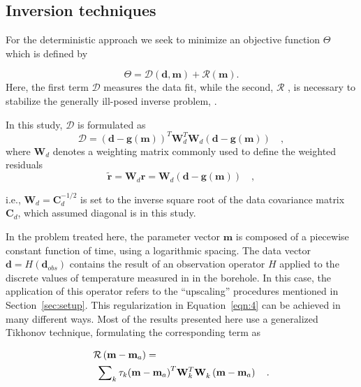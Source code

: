 \documentclass[cp]{copernicus}
\begin{document}
\subsection{Inversion techniques}
\label{sec:tinv}
For the deterministic approach we seek to minimize an objective function 
$\Theta$ which is defined by

\begin{equation}\label{eqn:4}
\Theta  = \mathcal{D}\left(\mathbf{d},\mathbf{m}\right) + \mathcal{R}\left(\mathbf{m} \right).
\end{equation} 
\noindent Here, the first term $\mathcal{D}$ measures the data fit, while the
second, $\mathcal{R}$ , is necessary to stabilize the generally ill-posed 
inverse problem, \cite[see][]{Aster2013a}. 

In this study, $\mathcal{D}$ is formulated as
\begin{equation} 
\mathcal{D} = 
 \left(\mathbf{d} - \mathbf{g(m)}\right)^T \mathbf{W}_d^T 
 \mathbf{W}_d^{}\left(\mathbf{d} - \mathbf{g(m)} \right)\quad,
\end{equation} 
\noindent where $\mathbf{W}_d$ denotes a weighting matrix commonly used to 
define the weighted residuals 
\begin{equation*}
\tilde{ \mathbf{r}} =\mathbf{W}_d^{}\mathbf{r} = 
\mathbf{W}_d^{} \left(\mathbf{d}-\mathbf{g}(\mathbf{m})\right)\quad, 
\end{equation*}

\noindent i.e., $\mathbf{W}_d = \mathbf{C}_d^{-1/2}$ is set to the inverse square root of the data 
covariance matrix $\mathbf{C}_d$, which assumed diagonal is in this study. 

In the problem treated here, the parameter vector $\mathbf{m}$ is composed of a piecewise constant 
function of time, using a logarithmic spacing. The data vector $\mathbf{d} = H(\mathbf{d}_{obs})$ 
contains the result of an observation operator $H$ applied to the discrete values of temperature 
measured in in the borehole. In this case, the application of this operator refers to the 
“upscaling” procedures mentioned in Section~\ref{sec:setup}. This regularization in 
Equation~\ref{eqn:4} can be achieved in many different ways. Most of the results presented here use 
a generalized Tikhonov technique, formulating the corresponding term as

\begin{equation}
\label{eqn:5}
\begin{gathered}
  \mathcal{R}\left( {{\mathbf{m}} - {{\mathbf{m}}_a}} \right) =  \hfill \\
  {\text{        }}\sum\nolimits_k {{\tau _k}} {\left( {{\mathbf{m}} - {{\mathbf{m}}_a}} 
\right)^T}{\mathbf{W}}_k^T{\mathbf{W}}_k^{}\left( {{\mathbf{m}} - {{\mathbf{m}}_a}} \right) \quad. 
\hfill \\ 
\end{gathered} 
\end{equation} 
\end{document}
